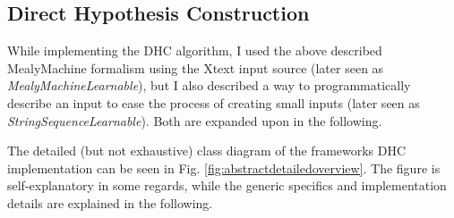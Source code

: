 \subsection{Direct Hypothesis Construction}

While implementing the DHC algorithm, I used the above described MealyMachine formalism using the Xtext input source (later seen as \emph{MealyMachineLearnable}), but I also described a way to programmatically describe an input to ease the process of creating small inputs (later seen as \emph{StringSequenceLearnable}). Both are expanded upon in the following.





\label{item:stringsequencelearnable}

The detailed (but not exhaustive) class diagram of the frameworks DHC implementation can be seen in Fig. \ref{fig:abstractdetailedoverview}. The figure is self-explanatory in some regards, while the generic specifics and implementation details are explained in the following.

